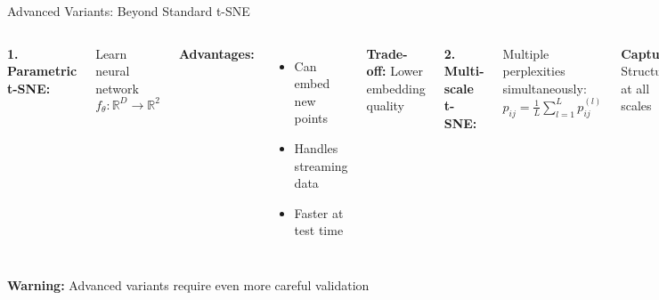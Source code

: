 \documentclass[aspectratio=169]{beamer}
\newcommand{\warning}[1]{\colorbox{red!10}{\textcolor{warningcolor}{\textbf{Warning:} #1}}}
\begin{document}
\begin{frame}{Advanced Variants: Beyond Standard t-SNE}
\begin{columns}
\textbf{1. Parametric t-SNE:}

Learn neural network $f_\theta: \mathbb{R}^D \to \mathbb{R}^2$

\textbf{Advantages:}
\begin{itemize}
\item Can embed new points
\item Handles streaming data
\item Faster at test time
\end{itemize}

\textbf{Trade-off:} Lower embedding quality

\vspace{0.3cm}
\textbf{2. Multi-scale t-SNE:}

Multiple perplexities simultaneously:
$p_{ij} = \frac{1}{L}\sum_{l=1}^L p_{ij}^{(l)}$

\textbf{Captures:} Structure at all scales

\textbf{Cost:} 3× slower

\textbf{3. Supervised t-SNE:}

Incorporate label information:
$p_{ij} = (1-\alpha)\cdot p_{ij}^{dist} + \alpha \cdot p_{ij}^{label}$

\textbf{Use case:} Emphasize class separation

\vspace{0.3cm}
\textbf{4. Dynamic t-SNE:}

For time series, add temporal smoothness:
$C = \sum_t \text{KL}(P^{(t)}||Q^{(t)}) + \lambda\sum_{i,t}\|y_i^{(t)} - y_i^{(t-1)}\|^2$

\vspace{0.3cm}
\end{columns}

\vspace{0.3cm}
\warning{Advanced variants require even more careful validation}
\end{frame}
\end{document}
